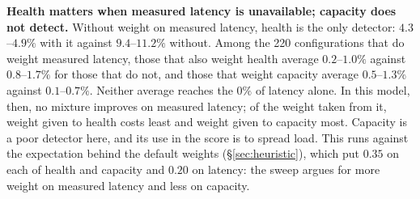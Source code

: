 \textbf{Health matters when measured latency is unavailable; capacity does
not detect.} Without weight on measured latency, health is the only detector:
$4.3$--$4.9\%$ with it against $9.4$--$11.2\%$ without. Among the 220
configurations that do weight measured latency, those that also weight health
average $0.2$--$1.0\%$ against $0.8$--$1.7\%$ for those that do not, and those
that weight capacity average $0.5$--$1.3\%$ against $0.1$--$0.7\%$. Neither
average reaches the $0\%$ of latency alone. In this model, then, no mixture
improves on measured latency; of the weight taken from it, weight given to
health costs least and weight given to capacity most. Capacity is a poor
detector here, and its use in the score is to spread load. This runs against
the expectation behind the default weights (\S\ref{sec:heuristic}), which put
$0.35$ on each of health and capacity and $0.20$ on latency: the sweep argues
for more weight on measured latency and less on capacity.

